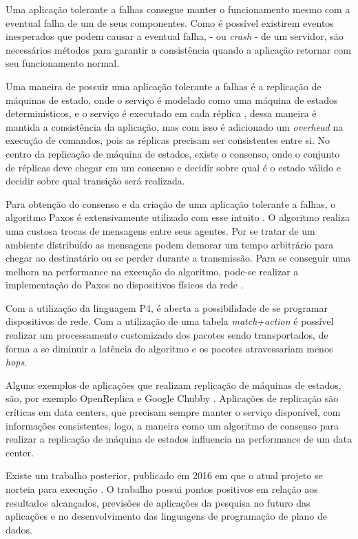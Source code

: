 \documentclass[12pt,
openright, 
oneside,
a4paper,
brazil]{facom-ufu-abntex2}
\theoremstyle{definition}
\begin{document}
Uma aplicação tolerante a falhas consegue manter o funcionamento mesmo com a eventual 
falha de um de seus componentes. Como é possível existirem eventos inesperados que podem
causar a eventual falha, - ou \textit{crash} - de um servidor, são necessários métodos
para garantir a consistência quando a aplicação retornar com seu funcionamento
normal. 

Uma maneira de possuir uma aplicação tolerante a falhas é a replicação de máquinas
de estado, onde o serviço é modelado como uma máquina de estados determinísticos, e o
serviço é executado em cada réplica \citep{santos2012state}, dessa maneira é mantida
a consistência da aplicação, mas com isso é adicionado um \textit{overhead} na execução
de comandos, pois as réplicas precisam ser consistentes entre si. No centro da replicação
de máquina de estados, existe o consenso, onde o conjunto de réplicas deve chegar 
em um consenso e decidir sobre qual é o estado válido e decidir sobre qual 
transição será realizada. 

Para obtenção do consenso e da criação de uma aplicação tolerante a falhas, o algoritmo
Paxos é extensivamente utilizado com esse intuito \citep{dang2016paxos}. 
O algoritmo realiza uma custosa trocas de mensagens entre seus agentes. Por se 
tratar de um ambiente distribuído as mensagens podem demorar um tempo arbitrário 
para chegar ao destinatário ou se perder durante a transmissão. Para se 
conseguir uma melhora na performance na execução do algoritmo, pode-se realizar a 
implementação do Paxos no dispositivos físicos da rede \citep{dang2016paxos}.

Com a utilização da linguagem P4, é aberta a possibilidade de se programar dispositivos
de rede. Com a utilização de uma tabela \textit{match+action} é possível 
realizar um processamento customizado dos pacotes sendo transportados, de forma a
se diminuir a latência do algoritmo e os pacotes atravessariam menos \textit{hops}.

Alguns exemplos de aplicações que realizam replicação de máquinas de estados, são,
por exemplo OpenReplica \citep{openreplica} e Google Chubby \citep{27897}. Aplicações
de replicação são críticas em data centers, que precisam sempre manter o serviço 
disponível, com informações consistentes, logo, a maneira como um algoritmo de consenso
para realizar a replicação de máquina de estados influencia na performance de um data center.

Existe um trabalho posterior, publicado em 2016 em que o atual projeto se norteia para
execução \citep{dang2016paxos}. O trabalho possui pontos positivos em relação aos 
resultados alcançados, previsões de aplicações da pesquisa no futuro das aplicações e 
no desenvolvimento das linguagens de programação de plano de dados.
\end{document}
